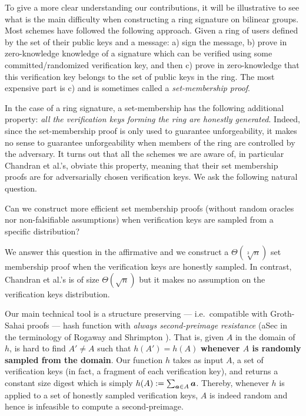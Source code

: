 
To give a more clear understanding our contributions, it will be illustrative to see what is the main difficulty when constructing a ring signature on bilinear groups. Most schemes have followed the following approach. Given a ring of users defined by the set of their public keys and a message: a) sign the message, b) prove in zero-knowledge knowledge of a signature which can be verified using some committed/randomized verification key, and then c) prove in zero-knowledge that this verification key belongs to the set of public keys in the ring.  The most expensive part is c) and is sometimes called a \emph{set-membership proof}.

In the case of a ring signature, a set-membership has the following additional property: \emph{all the verification keys forming the ring are honestly generated}. 
Indeed, since the set-membership proof is only used to guarantee unforgeability, it makes no sense to guarantee unforgeability when members of the ring are controlled by the adversary.
It turns out that all the schemes we are aware of, in particular Chandran et al.'s, obviate this property, meaning that their set membership proofs are for adversarially chosen verification keys.
We ask the following natural question.
\begin{displayquote}
Can we construct more efficient set membership proofs (without random oracles nor non-falsifiable assumptions) when verification keys are sampled from a specific distribution?
\end{displayquote}
We answer this question in the affirmative and we construct a $\Theta(\sqrt[3]{n})$ set membership proof when the verification keys are honestly sampled. In contrast, Chandran et al.'s is of size $\Theta(\sqrt{n})$ but it makes no assumption on the verification keys distribution.

Our main technical tool is a structure preserving --- i.e.~compatible with Groth-Sahai proofs --- hash function with \emph{always second-preimage resistance} (aSec in the terminology of Rogaway and Shrimpton \cite{FSE:RogShr04}). That is, given $A$ in the domain of $h$, is hard to find $A'\neq A$ such that $h(A')=h(A)$ {\bf whenever $A$ is randomly sampled from the domain}.
Our function $h$ takes as input $A$, a set of verification keys (in fact, a fragment of each verification key), and returns a constant size digest which is simply $h(A):= \sum_{{\boldsymbol{a}} \in A} {\boldsymbol{a}}$. Thereby, whenever $h$ is applied to a set of honestly sampled verification keys, $A$ is indeed random and hence is infeasible to compute a second-preimage.

